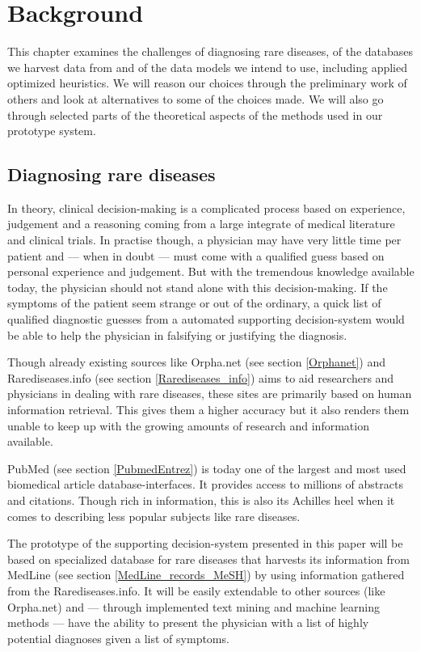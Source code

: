 \chapter{Background\label{Background}}

This chapter examines the challenges of diagnosing rare diseases, of
the databases we harvest data from and of the data models we intend to
use, including applied optimized heuristics. We will reason our
choices through the preliminary work of others and look at
alternatives to some of the choices made. We will also go through
selected parts of the theoretical aspects of the methods used in our prototype
system.

\section{Diagnosing rare diseases}

In theory, clinical decision-making is a complicated process based on
experience, judgement and a reasoning coming from a large integrate of
medical literature and clinical trials. In practise though, a
physician may have very little time per patient and --- when in doubt
--- must come with a qualified guess based on personal experience and
judgement. But with the tremendous knowledge available today, the
physician should not stand alone with this decision-making. If the
symptoms of the patient seem strange or out of the ordinary, a quick
list of qualified diagnostic guesses from a automated supporting
decision-system would be able to help the physician in falsifying or
justifying the diagnosis.

Though already existing sources like Orpha.net (see section
\ref{Orphanet}) and Rarediseases.info (see section
\ref{Rarediseases_info}) aims to aid researchers and physicians in
dealing with rare diseases, these sites are primarily based on human
information retrieval. This gives them a higher accuracy
 but it
also renders them unable to keep up with the growing amounts of
research and information available.

PubMed (see section \ref{PubmedEntrez}) is today one of the largest and most used
biomedical article database-interfaces. It provides access to millions
of abstracts and citations. Though rich in information, this is
also its Achilles heel when it comes to describing less popular
subjects like rare diseases.

The prototype of the supporting decision-system presented in this
paper will be based on specialized database for rare diseases that
harvests its information from MedLine (see section
\ref{MedLine_records_MeSH}) by using information gathered from the
Rarediseases.info. It will be easily extendable to other sources (like
Orpha.net) and --- through implemented text mining and machine
learning methods --- have the ability to present the physician with a
list of highly potential diagnoses given a list of symptoms.

